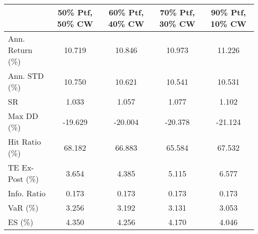 \begin{tabular}{lcccc}
\toprule
{} &  50\% Ptf, 50\% CW &  60\% Ptf, 40\% CW &  70\% Ptf, 30\% CW &  90\% Ptf, 10\% CW \\
\midrule
Ann. Return (\%) &           10.719 &           10.846 &           10.973 &           11.226 \\
Ann. STD (\%)    &           10.750 &           10.621 &           10.541 &           10.531 \\
SR              &            1.033 &            1.057 &            1.077 &            1.102 \\
Max DD (\%)      &          -19.629 &          -20.004 &          -20.378 &          -21.124 \\
Hit Ratio (\%)   &           68.182 &           66.883 &           65.584 &           67.532 \\
TE Ex-Post (\%)  &            3.654 &            4.385 &            5.115 &            6.577 \\
Info. Ratio     &            0.173 &            0.173 &            0.173 &            0.173 \\
VaR (\%)         &            3.256 &            3.192 &            3.131 &            3.053 \\
ES (\%)          &            4.350 &            4.256 &            4.170 &            4.046 \\
\bottomrule
\end{tabular}
